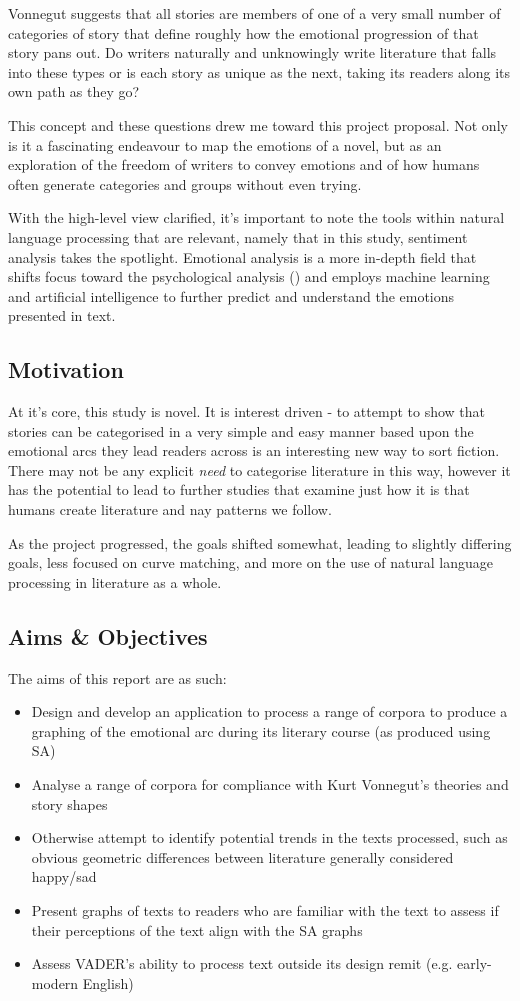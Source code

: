 \documentclass{article}
\begin{document}
        Vonnegut suggests that all stories are members of one of a very small number of categories of story that define roughly how the emotional progression of that story pans out. Do writers naturally and unknowingly write literature that falls into these types or is each story as unique as the next, taking its readers along its own path as they go?

        This concept and these questions drew me toward this project proposal. Not only is it a fascinating endeavour to map the emotions of a novel, but as an exploration of the freedom of writers to convey emotions and of how humans often generate categories and groups without even trying.

        With the high-level view clarified, it's important to note the tools within natural language processing that are relevant, namely that in this study, sentiment analysis takes the spotlight. Emotional analysis is a more in-depth field that shifts focus toward the psychological analysis (\cite{sentimentVsEmotionAnalysis}) and employs machine learning and artificial intelligence to further predict and understand the emotions presented in text.
    \subsection{Motivation}
        At it's core, this study is novel. It is interest driven - to attempt to show that stories can be categorised in a very simple and easy manner based upon the emotional arcs they lead readers across is an interesting new way to sort fiction. There may not be any explicit \textit{need} to categorise literature in this way, however it has the potential to lead to further studies that examine just how it is that humans create literature and nay patterns we follow.

        As the project progressed, the goals shifted somewhat, leading to slightly differing goals, less focused on curve matching, and more on the use of natural language processing in literature as a whole.
    \subsection{Aims \& Objectives}
        The aims of this report are as such:
        \begin{itemize}
            \item Design and develop an application to process a range of corpora to produce a graphing of the emotional arc during its literary course (as produced using SA)
            \item Analyse a range of corpora for compliance with Kurt Vonnegut’s theories and story shapes
            \item Otherwise attempt to identify potential trends in the texts processed, such as obvious geometric differences between literature generally considered happy/sad
            \item Present graphs of texts to readers who are familiar with the text to assess if their perceptions of the text align with the SA graphs
            \item Assess VADER's ability to process text outside its design remit (e.g. early-modern English)
        \end{itemize}
\end{document}
